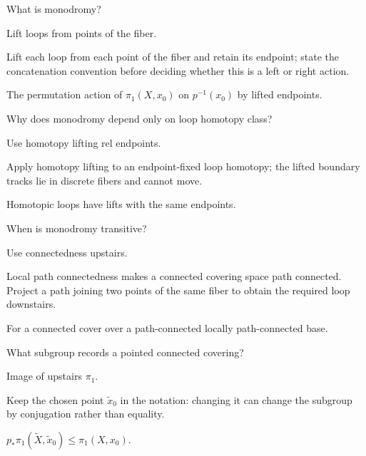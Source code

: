 \begin{exercise}\label{exr:viii11-19}
What is monodromy?
\end{exercise}
\begin{hint}
Lift loops from points of the fiber.

Lift each loop from each point of the fiber and retain its endpoint; state the concatenation convention before deciding whether this is a left or right action.
\end{hint}
\begin{solution}
The permutation action of \(\pi_1(X,x_0)\) on \(p^{-1}(x_0)\) by lifted endpoints.
\end{solution}

\begin{exercise}\label{exr:viii11-20}
Why does monodromy depend only on loop homotopy class?
\end{exercise}
\begin{hint}
Use homotopy lifting rel endpoints.

Apply homotopy lifting to an endpoint-fixed loop homotopy; the lifted boundary tracks lie in discrete fibers and cannot move.
\end{hint}
\begin{solution}
Homotopic loops have lifts with the same endpoints.
\end{solution}

\begin{exercise}\label{exr:viii11-21}
When is monodromy transitive?
\end{exercise}
\begin{hint}
Use connectedness upstairs.

Local path connectedness makes a connected covering space path connected. Project a path joining two points of the same fiber to obtain the required loop downstairs.
\end{hint}
\begin{solution}
For a connected cover over a path-connected locally path-connected base.
\end{solution}

\begin{exercise}\label{exr:viii11-22}
What subgroup records a pointed connected covering?
\end{exercise}
\begin{hint}
Image of upstairs \(\pi_1\).

Keep the chosen point \(\tilde x_0\) in the notation: changing it can change the subgroup by conjugation rather than equality.
\end{hint}
\begin{solution}
\(p_*\pi_1(\widetilde X,\tilde x_0)\le\pi_1(X,x_0)\).
\end{solution}

